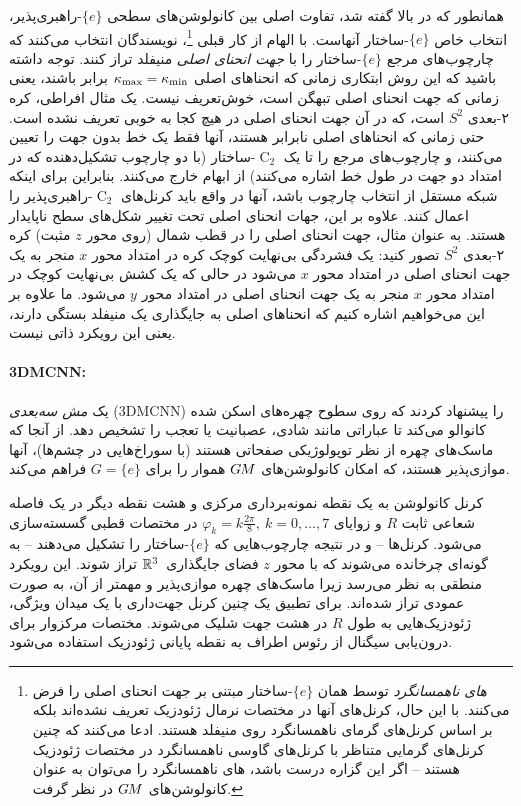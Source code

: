 همانطور که در بالا گفته شد، تفاوت اصلی بین کانولوشن‌های سطحی $\{e\}$-راهبری‌پذیر، انتخاب خاص $\{e\}$-ساختار آنهاست.
با الهام از کار قبلی \citet{boscaini2016learning}%
\footnote{
	\emph{های ناهمسانگرد} توسط \citet{boscaini2016learning} همان $\{e\}$-ساختار مبتنی بر جهت انحنای اصلی را فرض می‌کنند.
	با این حال، کرنل‌های آنها در مختصات نرمال ژئودزیک تعریف نشده‌اند بلکه بر اساس کرنل‌های گرمای ناهمسانگرد روی منیفلد هستند.
	\citet{monti2017geometric} ادعا می‌کنند که چنین کرنل‌های گرمایی متناظر با کرنل‌های گاوسی ناهمسانگرد در مختصات ژئودزیک هستند -- اگر این گزاره درست باشد، های ناهمسانگرد را می‌توان به عنوان کانولوشن‌های $G\mkern-1.4muM$ در نظر گرفت.
}،
نویسندگان انتخاب می‌کنند که چارچوب‌های مرجع $\{e\}$-ساختار را با \emph{جهت انحنای اصلی} منیفلد تراز کنند.
توجه داشته باشید که این روش ابتکاری زمانی که انحناهای اصلی $\kappa_{\textup{max}} = \kappa_{\textup{min}}$ برابر باشند، یعنی زمانی که جهت انحنای اصلی تبهگن است، خوش‌تعریف نیست.
یک مثال افراطی، کره ۲-بعدی $S^2$ است، که در آن جهت انحنای اصلی در هیچ کجا به خوبی تعریف نشده است.
حتی زمانی که انحناهای اصلی نابرابر هستند، آنها فقط یک خط بدون جهت را تعیین می‌کنند، و چارچوب‌های مرجع را تا یک $\operatorname{C}_2$-ساختار (با دو چارچوب تشکیل‌دهنده که در امتداد دو جهت در طول خط اشاره می‌کنند) از ابهام خارج می‌کنند.
بنابراین برای اینکه شبکه مستقل از انتخاب چارچوب باشد، آنها در واقع باید کرنل‌های $\operatorname{C}_2$-راهبری‌پذیر را اعمال کنند.
علاوه بر این، جهات انحنای اصلی تحت تغییر شکل‌های سطح ناپایدار هستند.
به عنوان مثال، جهت انحنای اصلی را در قطب شمال (روی محور $z$ مثبت) کره ۲-بعدی $S^2$ تصور کنید:
یک فشردگی بی‌نهایت کوچک کره در امتداد محور $x$ منجر به یک جهت انحنای اصلی در امتداد محور $x$ می‌شود در حالی که یک کشش بی‌نهایت کوچک در امتداد محور $x$ منجر به یک جهت انحنای اصلی در امتداد محور $y$ می‌شود.
ما علاوه بر این می‌خواهیم اشاره کنیم که انحناهای اصلی به جایگذاری یک منیفلد بستگی دارند، یعنی این رویکرد ذاتی نیست.





\paragraph{3DMCNN:}
\citet{jin2018learning} یک \emph{ مش سه‌بعدی} (3DMCNN) را پیشنهاد کردند که روی سطوح چهره‌های اسکن شده کانوالو می‌کند تا عباراتی مانند شادی، عصبانیت یا تعجب را تشخیص دهد.
از آنجا که ماسک‌های چهره از نظر توپولوژیکی صفحاتی هستند (با سوراخ‌هایی در چشم‌ها)، آنها موازی‌پذیر هستند، که امکان کانولوشن‌های $G\mkern-1.4muM$ هموار را برای ${G=\{e\}}$ فراهم می‌کند.

کرنل کانولوشن به یک نقطه نمونه‌برداری مرکزی و هشت نقطه دیگر در یک فاصله شعاعی ثابت $R$ و زوایای $\varphi_k = k\frac{2\pi}{8},\ k=0,\dots,7$ در مختصات قطبی گسسته‌سازی می‌شود.
کرنل‌ها -- و در نتیجه چارچوب‌هایی که $\{e\}$-ساختار را تشکیل می‌دهند -- به گونه‌ای چرخانده می‌شوند که با محور $z$ فضای جایگذاری~$\mathbb{R}^3$ تراز شوند.
این رویکرد منطقی به نظر می‌رسد زیرا ماسک‌های چهره موازی‌پذیر و مهمتر از آن، به صورت عمودی تراز شده‌اند.
برای تطبیق یک چنین کرنل جهت‌داری با یک میدان ویژگی، ژئودزیک‌هایی به طول $R$ در هشت جهت شلیک می‌شوند.
مختصات مرکزوار برای درون‌یابی سیگنال از رئوس اطراف به نقطه پایانی ژئودزیک استفاده می‌شود.








